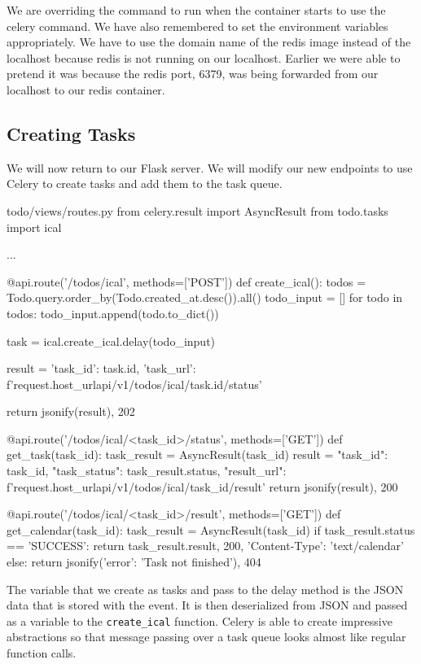 \documentclass{csse4400}
\begin{document}
We are overriding the command to run when the container starts to use the celery command.
We have also remembered to set the environment variables appropriately.
We have to use the domain name of the redis image instead of the localhost because redis is not running on our localhost.
Earlier we were able to pretend it was because the redis port, 6379, was being forwarded from our localhost to our redis container.

\subsection{Creating Tasks}

We will now return to our Flask server.
We will modify our new endpoints to use Celery to create tasks and add them to the task queue.
%
\begin{code}[language=python,numbers=none]{todo/views/routes.py}
from celery.result import AsyncResult
from todo.tasks import ical

...

@api.route('/todos/ical', methods=['POST'])
def create_ical():
    todos = Todo.query.order_by(Todo.created_at.desc()).all()
    todo_input = []
    for todo in todos:
        todo_input.append(todo.to_dict())

    task = ical.create_ical.delay(todo_input)

    result = {
        'task_id': task.id,
        'task_url': f'{request.host_url}api/v1/todos/ical/{task.id}/status'
    }

    return jsonify(result), 202

@api.route('/todos/ical/<task_id>/status', methods=['GET'])
def get_task(task_id):
    task_result = AsyncResult(task_id)
    result = {
        "task_id": task_id,
        "task_status": task_result.status,
        "result_url": f'{request.host_url}api/v1/todos/ical/{task_id}/result'
    }
    return jsonify(result), 200

@api.route('/todos/ical/<task_id>/result', methods=['GET'])
def get_calendar(task_id):
    task_result = AsyncResult(task_id)
    if task_result.status == 'SUCCESS':
        return task_result.result, 200, {'Content-Type': 'text/calendar'}
    else:
        return jsonify({'error': 'Task not finished'}), 404
\end{code}

The variable that we create as tasks and pass to the delay method is the JSON data that is stored with the event.
It is then deserialized from JSON and passed as a variable to the \texttt{create\_ical} function.
Celery is able to create impressive abstractions so that message passing over a task queue looks almost like regular function calls.
\end{document}
